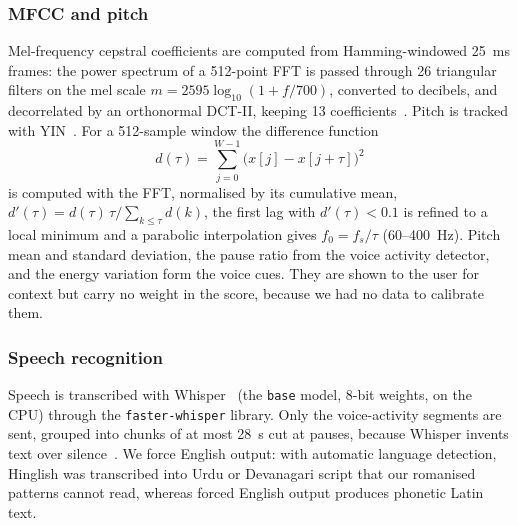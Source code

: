 \documentclass[letterpaper,12pt]{article}
\begin{document}
\subsubsection{MFCC and pitch}\label{sec:feat}
Mel-frequency cepstral coefficients are computed from Hamming-windowed 25~ms frames: the power spectrum of a 512-point FFT is passed through 26 triangular filters on the mel scale $m = 2595\log_{10}(1 + f/700)$, converted to decibels, and decorrelated by an orthonormal DCT-II, keeping 13 coefficients~\cite{davis1980mfcc}. Pitch is tracked with YIN~\cite{decheveigne2002yin}. For a 512-sample window the difference function
\begin{equation}
d(\tau) = \sum_{j=0}^{W-1}\bigl(x[j] - x[j+\tau]\bigr)^2
\end{equation}
is computed with the FFT, normalised by its cumulative mean, $d'(\tau) = d(\tau)\,\tau / \sum_{k\le\tau} d(k)$, the first lag with $d'(\tau) < 0.1$ is refined to a local minimum and a parabolic interpolation gives $f_0 = f_s/\tau$ (60--400~Hz). Pitch mean and standard deviation, the pause ratio from the voice activity detector, and the energy variation form the voice cues. They are shown to the user for context but carry no weight in the score, because we had no data to calibrate them.

\subsubsection{Speech recognition}
Speech is transcribed with Whisper~\cite{radford2023whisper} (the \texttt{base} model, 8-bit weights, on the CPU) through the \texttt{faster-whisper} library. Only the voice-activity segments are sent, grouped into chunks of at most 28~s cut at pauses, because Whisper invents text over silence~\cite{koenecke2024whisper}. We force English output: with automatic language detection, Hinglish was transcribed into Urdu or Devanagari script that our romanised patterns cannot read, whereas forced English output produces phonetic Latin text.
\end{document}
